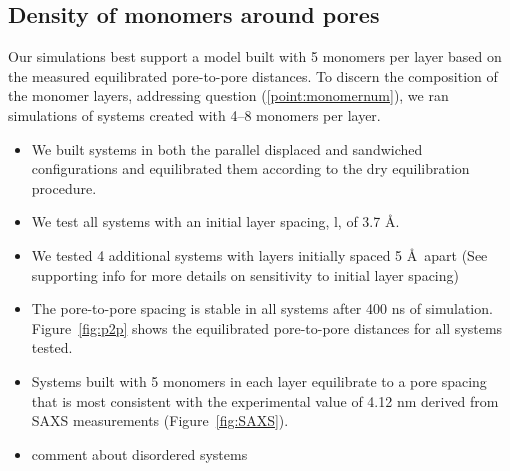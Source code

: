 \documentclass{article}
\begin{document}
  \subsection{Density of monomers around pores}
  Our simulations best support a model built with 5 monomers per layer based on
  the measured equilibrated pore-to-pore distances. To discern the composition of
  the monomer layers, addressing question (\ref{point:monomernum}), we ran
  simulations of systems created with 4--8 monomers per layer. 
  \begin{itemize}  
  		\item We built systems in both the parallel displaced and sandwiched configurations and
  		equilibrated them according to the dry equilibration procedure.
  		\item We test all systems with an initial layer spacing, l, of 3.7 \AA.
  		\item We tested 4 additional systems with layers initially spaced 5 \AA~apart (See 
  		supporting info for more details on sensitivity to initial layer spacing)
  		\item The pore-to-pore spacing is stable in all systems after 400 ns of simulation. 
  		Figure~\ref{fig:p2p} shows the equilibrated pore-to-pore distances for all systems 
  		tested. 
  		\item Systems built with 5 monomers in each layer equilibrate to a pore spacing that is 
  		most consistent with the experimental value of 4.12 nm derived from SAXS measurements 
	    (Figure~\ref{fig:SAXS}).
	    \item comment about disordered systems
  \end{itemize}
  
\end{document}
